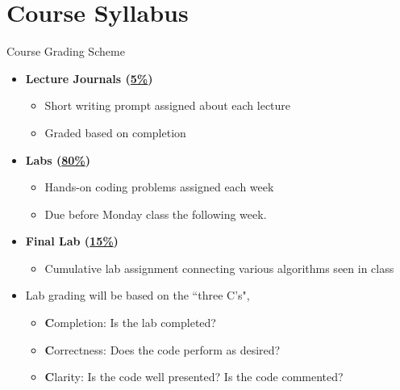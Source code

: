 {}\documentclass[letterpaper,
compress,
xcolor=x11names,
]{beamer}
\begin{document}
\section{Course Syllabus}
\begin{frame}{Course Grading Scheme}
	\footnotesize
	\begin{itemize}
		\item\textbf{Lecture Journals (\underline{5\%})}
			\begin{itemize}
				\item Short writing prompt assigned about each lecture
				\item Graded based on completion
			\end{itemize}
		\item<2->\textbf{Labs (\underline{80\%})}
			\begin{itemize}
				\item Hands-on coding problems assigned each week
				\item Due before Monday class the following week.
			\end{itemize}
		\item<3->\textbf{Final Lab (\underline{15\%})}
			\begin{itemize}
				\item Cumulative lab assignment connecting various algorithms seen in class
			\end{itemize}
		\item<4-> Lab grading will be based on the ``three C's", 
			\begin{itemize}
				\item \textbf{C}ompletion: Is the lab completed?
				\item \textbf{C}orrectness: Does the code perform as desired?
				\item \textbf{C}larity: Is the code well presented? Is the code commented?
			\end{itemize}
	\end{itemize}
\end{frame}
\end{document}
